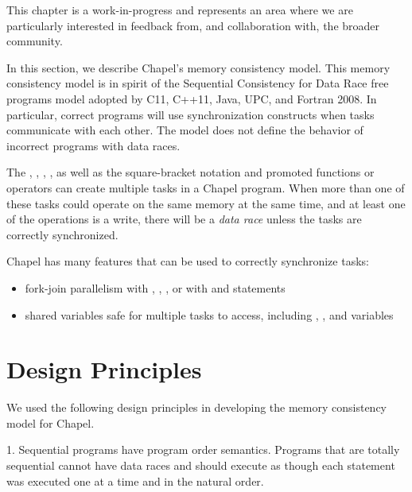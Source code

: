 \label{Memory_Consistency_Model}

\begin{openissue}
  This chapter is a work-in-progress and represents an area where we
  are particularly interested in feedback from, and collaboration
  with, the broader community.
\end{openissue}

In this section, we describe Chapel's memory consistency model. This memory
consistency model is in spirit of the Sequential Consistency for Data Race free
programs model adopted by C11, C++11, Java, UPC, and Fortran 2008. In
particular, correct programs will use synchronization constructs when tasks
communicate with each other. The model does not define the behavior of
incorrect programs with data races.

The , , , , as well as
the square-bracket notation and promoted functions or operators can create
multiple tasks in a Chapel program. When more than one of these tasks could
operate on the same memory at the same time, and at least one of the operations
is a write, there will be a \textit{data race} unless the tasks are correctly
synchronized.

Chapel has many features that can be used to correctly synchronize tasks:

\begin{itemize}

  \item fork-join parallelism with , ,
, or with  and  statements

  \item shared variables safe for multiple tasks to access, including
, , and  variables

\end{itemize}

\section{Design Principles}

We used the following design principles in developing the memory consistency
model for Chapel.

1. Sequential programs have program order semantics. Programs that are totally
   sequential cannot have data races and should execute as though each statement
   was executed one at a time and in the natural order.


